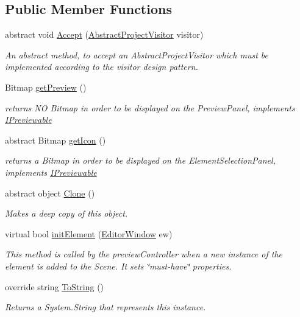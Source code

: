 \subsection*{Public Member Functions}
\begin{DoxyCompactItemize}
\item 
abstract void \hyperlink{class_a_rdev_kit_1_1_model_1_1_project_1_1_abstract_source_ad45fa69ac940512f91457ca7c7661882}{Accept} (\hyperlink{class_a_rdev_kit_1_1_controller_1_1_project_controller_1_1_abstract_project_visitor}{Abstract\-Project\-Visitor} visitor)
\begin{DoxyCompactList}\small\item\em An abstract method, to accept an Abstract\-Project\-Visitor which must be implemented according to the visitor design pattern. \end{DoxyCompactList}\item 
Bitmap \hyperlink{class_a_rdev_kit_1_1_model_1_1_project_1_1_abstract_source_abd9f742efb27a1fca992f6627c0421e4}{get\-Preview} ()
\begin{DoxyCompactList}\small\item\em returns N\-O Bitmap in order to be displayed on the Preview\-Panel, implements \hyperlink{interface_a_rdev_kit_1_1_model_1_1_project_1_1_i_previewable}{I\-Previewable} \end{DoxyCompactList}\item 
abstract Bitmap \hyperlink{class_a_rdev_kit_1_1_model_1_1_project_1_1_abstract_source_ae698f1c9d55cc0603931bd2804d0c35d}{get\-Icon} ()
\begin{DoxyCompactList}\small\item\em returns a Bitmap in order to be displayed on the Element\-Selection\-Panel, implements \hyperlink{interface_a_rdev_kit_1_1_model_1_1_project_1_1_i_previewable}{I\-Previewable} \end{DoxyCompactList}\item 
abstract object \hyperlink{class_a_rdev_kit_1_1_model_1_1_project_1_1_abstract_source_a17fb18629481715303c5c55a867bb023}{Clone} ()
\begin{DoxyCompactList}\small\item\em Makes a deep copy of this object. \end{DoxyCompactList}\item 
virtual bool \hyperlink{class_a_rdev_kit_1_1_model_1_1_project_1_1_abstract_source_ae0ad810da02d289ddcbb28bb2aabec43}{init\-Element} (\hyperlink{class_a_rdev_kit_1_1_editor_window}{Editor\-Window} ew)
\begin{DoxyCompactList}\small\item\em This method is called by the preview\-Controller when a new instance of the element is added to the Scene. It sets \char`\"{}must-\/have\char`\"{} properties. \end{DoxyCompactList}\item 
override string \hyperlink{class_a_rdev_kit_1_1_model_1_1_project_1_1_abstract_source_a74cf779ccb9c125ff5202864414f2078}{To\-String} ()
\begin{DoxyCompactList}\small\item\em Returns a System.\-String that represents this instance. \end{DoxyCompactList}\end{DoxyCompactItemize}
